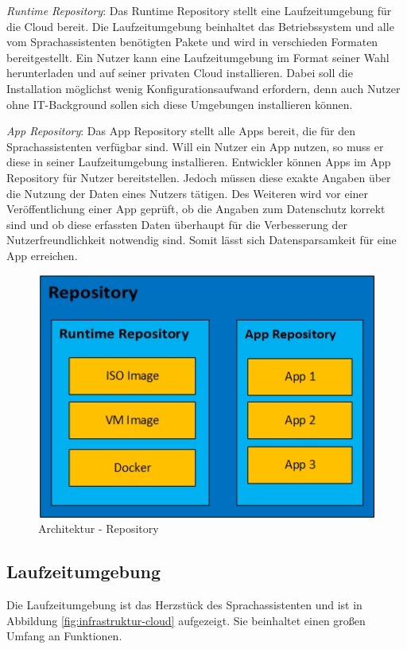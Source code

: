 \begin{description}
	\item \textit{Runtime Repository}: Das Runtime Repository stellt eine Laufzeitumgebung für die Cloud bereit. Die Laufzeitumgebung beinhaltet das Betriebssystem und alle vom Sprachassistenten benötigten Pakete und wird in verschieden Formaten bereitgestellt. Ein Nutzer kann eine Laufzeitumgebung im Format seiner Wahl herunterladen und auf seiner privaten Cloud installieren. Dabei soll die Installation möglichst wenig Konfigurationsaufwand erfordern, denn auch Nutzer ohne IT-Background sollen sich diese Umgebungen installieren können. 
	\item \textit{App Repository}: Das App Repository stellt alle Apps bereit, die für den Sprachassistenten verfügbar sind. Will ein Nutzer ein App nutzen, so muss er diese in seiner Laufzeitumgebung installieren. Entwickler können Apps im App Repository für Nutzer bereitstellen. Jedoch müssen diese exakte Angaben über die Nutzung der Daten eines Nutzers tätigen. Des Weiteren wird vor einer Veröffentlichung einer App geprüft, ob die Angaben zum Datenschutz korrekt sind und ob diese erfassten Daten überhaupt für die Verbesserung der Nutzerfreundlichkeit notwendig sind. Somit lässt sich Datensparsamkeit für eine App erreichen.
\end{description}


\begin{figure}[h!]
	\centering
	\includegraphics[width=0.6\linewidth]{Picture/Infrastruktur-Repository.jpg}
	\caption[Architektur - Mobile App]{Architektur - Repository}
	\label{fig:infrastruktur-repository}
\end{figure}

\subsection{Laufzeitumgebung}
Die Laufzeitumgebung ist das Herzstück des Sprachassistenten und ist in Abbildung \ref{fig:infrastruktur-cloud} aufgezeigt. Sie beinhaltet einen großen Umfang an Funktionen.


